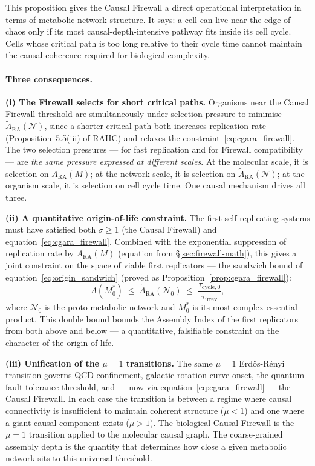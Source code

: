 \documentclass[11pt,a4paper]{article}
\theoremstyle{plain}
\theoremstyle{definition}
\theoremstyle{remark}
\newcommand{\ARA}{A_{\mathrm{RA}}}
\begin{document}
\medskip\noindent
This proposition gives the Causal Firewall a direct operational interpretation
in terms of metabolic network structure. It says: a cell can live near the
edge of chaos only if its most causal-depth-intensive pathway fits inside its
cell cycle. Cells whose critical path is too long relative to their cycle time
cannot maintain the causal coherence required for biological complexity.

\paragraph{Three consequences.}

\medskip\noindent
\textbf{(i) The Firewall selects for short critical paths.}
Organisms near the Causal Firewall threshold are simultaneously under selection
pressure to minimise $\tilde{A}_{\mathrm{RA}}(\mathcal{N})$, since a shorter
critical path both increases replication rate (Proposition~5.5(iii) of RAHC)
and relaxes the constraint~\eqref{eq:cgara_firewall}. The two selection
pressures --- for fast replication and for Firewall compatibility --- are
\emph{the same pressure expressed at different scales}. At the molecular scale,
it is selection on $\ARA(M)$; at the network scale, it is selection on
$\tilde{A}_{\mathrm{RA}}(\mathcal{N})$; at the organism scale, it is
selection on cell cycle time. One causal mechanism drives all three.

\medskip\noindent
\textbf{(ii) A quantitative origin-of-life constraint.}
The first self-replicating systems must have satisfied both $\sigma \geq 1$
(the Causal Firewall) and equation~\eqref{eq:cgara_firewall}. Combined with
the exponential suppression of replication rate by $\ARA(M)$ (equation from
§\ref{sec:firewall-math}), this gives a joint constraint on the space of viable
first replicators --- the sandwich bound of equation~\eqref{eq:origin_sandwich}
(proved as Proposition~\ref{prop:cgara_firewall}):
\begin{equation*}
  A(M^*_0) \;\leq\;
  \tilde{A}_{\mathrm{RA}}(\mathcal{N}_0) \;\leq\;
  \frac{\tau_{\mathrm{cycle},0}}{\tau_{\mathrm{irrev}}},
\end{equation*}
where $\mathcal{N}_0$ is the proto-metabolic network and $M^*_0$ is its
most complex essential product. This double bound
bounds the Assembly Index of the first replicators from both above and below ---
a quantitative, falsifiable constraint on the character of the origin of life.

\medskip\noindent
\textbf{(iii) Unification of the $\mu = 1$ transitions.}
The same $\mu = 1$ Erd\H{o}s-R\'{e}nyi transition governs QCD
confinement, galactic rotation curve onset, the quantum fault-tolerance
threshold, and --- now via equation~\eqref{eq:cgara_firewall} --- the Causal
Firewall. In each case the transition is between a regime where causal
connectivity is insufficient to maintain coherent structure ($\mu < 1$) and
one where a giant causal component exists ($\mu > 1$). The biological Causal
Firewall is the $\mu = 1$ transition applied to the molecular causal graph.
The coarse-grained assembly depth is the quantity that determines how close a
given metabolic network sits to this universal threshold.
\end{document}
